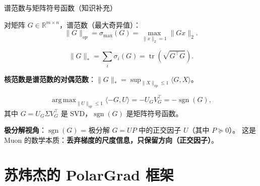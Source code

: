 \documentclass[aspectratio=169,10pt]{ctexbeamer}
\newcommand{\R}{\mathbb{R}}
\newcommand{\tr}{\operatorname{tr}}
\DeclareMathOperator*{\argmax}{arg\,max}
\DeclareMathOperator{\sgn}{sgn}
\begin{document}
\begin{frame}{谱范数与矩阵符号函数（知识补充）}
\begin{definition}
  对矩阵 $G\in\R^{m\times n}$，谱范数（最大奇异值）：
  \[
    \|G\|_{op} = \sigma_{\max}(G) = \max_{\|x\|_2=1}\|Gx\|_2.
  \]
\end{definition}

\begin{definition}
  \[
    \|G\|_* = \sum_i \sigma_i(G) = \tr(\sqrt{G^\top G}).
  \]
\end{definition}

\vspace{0.15cm}
\textbf{核范数是谱范数的对偶范数}：$\|G\|_* = \sup_{\|X\|_{op}\le 1}\langle G,X\rangle$。

\vspace{0.15cm}
\begin{theorem}[谱范数下的最陡方向]
  \[
    \argmax_{\|U\|_{op}\le 1}\langle -G, U\rangle = -U_G V_G^\top = -\sgn(G),
  \]
  其中 $G=U_G\Sigma V_G^\top$ 是 SVD，$\sgn(G)$ 是矩阵符号函数。
\end{theorem}

\vspace{0.15cm}
\textbf{极分解视角}：$\sgn(G)$ = 极分解 $G=UP$ 中的正交因子 $U$（其中 $P\succeq0$）。
这是 Muon 的数学本质：\textbf{丢弃梯度的尺度信息，只保留方向（正交因子）}。
\end{frame}

\section{苏炜杰的 PolarGrad 框架}
\end{document}
